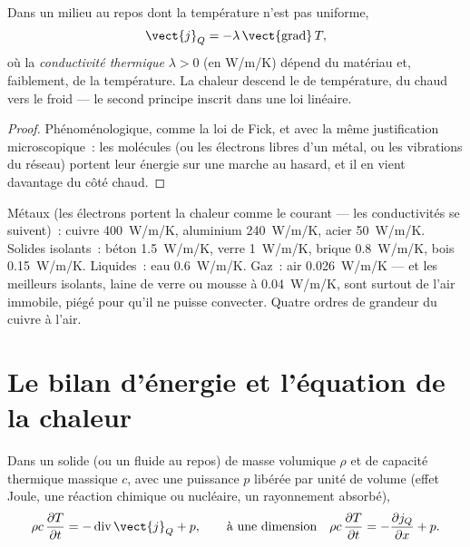 \begin{theorem}\label{thm:b2:heat-conduction:fourier}
Dans un milieu au repos dont la température n'est pas uniforme,
\[
\vect{j}_Q = -\lambda\,\vect{\operatorname{grad}}\,T ,
\]
où la \emph{conductivité thermique}
$\lambda > 0$ (en \unit{W/m/K}) dépend du matériau et, faiblement, de
la température. La chaleur descend le  de température, du chaud vers le
froid --- le second principe inscrit dans une loi linéaire.
\end{theorem}

\begin{proof}
Phénoménologique, comme la loi de Fick, et avec la même justification
microscopique~: les molécules (ou les électrons libres d'un métal, ou les
vibrations du réseau) portent leur énergie sur une marche au hasard, et il en
vient davantage du côté chaud.
\end{proof}

\begin{example}[Conductivités]\label{ex:b2:heat-conduction:values}
Métaux (les électrons portent la chaleur comme le courant ---
les conductivités se suivent)~: cuivre \qty{400}{W/m/K}, aluminium
\qty{240}{W/m/K}, acier \qty{50}{W/m/K}. Solides isolants~: béton
\qty{1.5}{W/m/K}, verre \qty{1}{W/m/K}, brique \qty{0.8}{W/m/K}, bois
\qty{0.15}{W/m/K}. Liquides~: eau \qty{0.6}{W/m/K}. Gaz~: air
\qty{0.026}{W/m/K} --- et les meilleurs isolants, laine de verre ou mousse à
\qty{0.04}{W/m/K}, sont surtout de l'air immobile, piégé pour qu'il ne puisse
convecter. Quatre ordres de grandeur du cuivre à l'air.
\end{example}

\section{Le bilan d'énergie et l'équation de la chaleur}

\begin{theorem}\label{thm:b2:heat-conduction:balance}
Dans un solide (ou un fluide au repos) de masse volumique $\rho$ et de capacité thermique
massique $c$, avec une puissance $p$ libérée par unité de volume (effet Joule, une
réaction chimique ou nucléaire, un rayonnement absorbé),
\[
\rho c\,\frac{\partial T}{\partial t} = -\operatorname{div}\vect{j}_Q + p ,
\qquad\text{à une dimension}\quad
\rho c\,\frac{\partial T}{\partial t} = -\frac{\partial j_Q}{\partial x} + p .
\]
\end{theorem}

